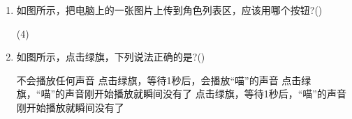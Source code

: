 \documentclass[10pt, a4paper]{article}
\begin{document}
\begin{enumerate}
        \item 如图所示，把电脑上的一张图片上传到角色列表区，应该用哪个按钮?(\qquad)
        \begin{tasks}(4)
            \task {}
            \task {}
            \task {}
            \task {}
        \end{tasks}

        \item 如图所示，点击绿旗，下列说法正确的是?(\qquad)
        \begin{tasks}
            \task 不会播放任何声音
            \task 点击绿旗，等待1秒后，会播放“喵”的声音
            \task 点击绿旗，“喵”的声音刚开始播放就瞬间没有了
            \task 点击绿旗，等待1秒后，“喵”的声音刚开始播放就瞬间没有了
        \end{tasks}


\end{enumerate}
\end{document}
